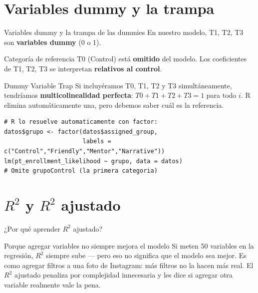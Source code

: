 \documentclass[aspectratio=169, 11pt]{beamer}
\begin{document}
\section{Variables dummy y la trampa}

\begin{frame}[fragile]{Variables dummy y la trampa de las dummies}
En nuestro modelo, T1, T2, T3 son \textbf{variables dummy} (0 o 1).

\vspace{0.2cm}
\begin{block}{Categoría de referencia}
T0 (Control) está \textbf{omitido} del modelo. Los coeficientes de T1, T2, T3 se interpretan \textbf{relativos al control}.
\end{block}

\vspace{0.2cm}
\begin{alertblock}{Dummy Variable Trap}
Si incluyéramos T0, T1, T2 y T3 simultáneamente, tendríamos \textbf{multicolinealidad perfecta}: $T0 + T1 + T2 + T3 = 1$ para todo $i$. R elimina automáticamente una, pero debemos saber cuál es la referencia.
\end{alertblock}

\vspace{0.2cm}
\begin{lstlisting}[basicstyle=\ttfamily\scriptsize]
# R lo resuelve automaticamente con factor:
datos$grupo <- factor(datos$assigned_group,
                      labels = c("Control","Friendly","Mentor","Narrative"))
lm(pt_enrollment_likelihood ~ grupo, data = datos)
# Omite grupoControl (la primera categoria)
\end{lstlisting}
\end{frame}

\section{$R^2$ y $R^2$ ajustado}

\begin{frame}{¿Por qué aprender $R^2$ ajustado?}
\begin{exampleblock}{Porque agregar variables no siempre mejora el modelo}
\small
Si meten 50 variables en la regresión, $R^2$ siempre sube --- pero eso no significa que el modelo sea mejor. Es como agregar filtros a una foto de Instagram: más filtros no la hacen más real. El $R^2$ ajustado penaliza por complejidad innecesaria y les dice si agregar otra variable realmente vale la pena.
\end{exampleblock}
\end{frame}
\end{document}
